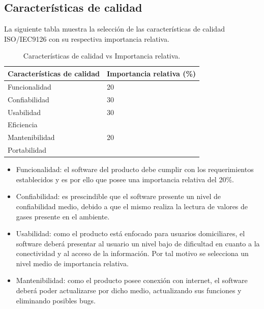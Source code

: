 \documentclass[11pt]{article}
\begin{document}
\subsection{Características de calidad}
La siguiente tabla muestra la selección de las características de calidad
ISO/IEC9126 con su respectiva importancia relativa.
\FloatBarrier
\begin{table}[ht]
    \centering
    \begin{tabular}{|l|l|}\hline \hline
        \rowcolor[HTML]{d6c6c3}
        \bf Características de calidad & \bf Importancia relativa (\%) \\
        \hline
        \hline
        Funcionalidad                  & 20                            \\
        Confiabilidad                  & 30                            \\
        Usabilidad                     & 30                            \\
        Eficiencia                     &                               \\
        Mantenibilidad                 & 20                            \\
        Portabilidad                   &                               \\
        \hline
    \end{tabular}
    \caption{Características de calidad vs Importancia relativa.}
\end{table}
\begin{itemize}
    \item Funcionalidad: el software del producto debe cumplir con los
          requerimientos establecidos y es por ello que posee una importancia
          relativa
          del 20\%.

    \item Confiabilidad: es prescindible que el software presente un nivel de
          confiabilidad medio, debido a que el mismo realiza la lectura de
          valores de
          gases presente en el ambiente.
    \item Usabilidad: como el producto está enfocado para usuarios
          domiciliares, el software deberá presentar al usuario un nivel bajo
          de
          dificultad en cuanto a la conectividad y al acceso de la información.
          Por tal
          motivo se selecciona un nivel medio de importancia relativa.
    \item Mantenibilidad: como el producto posee conexión con internet, el
          software deberá poder actualizarse por dicho medio, actualizando sus
          funciones
          y eliminando posibles bugs.
\end{itemize}
\end{document}
